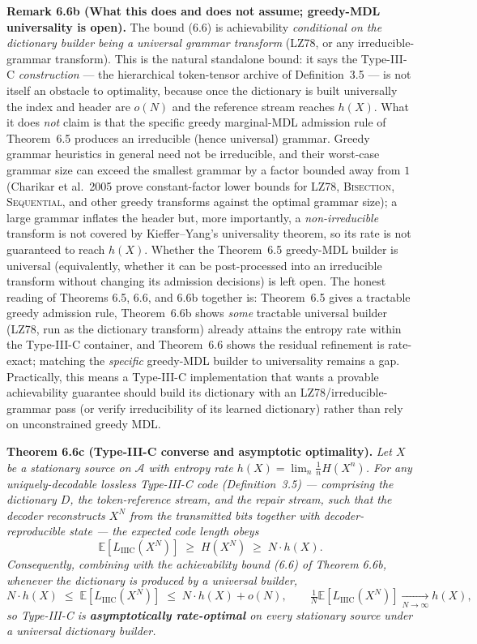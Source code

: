 \documentclass[
]{article}
\begin{document}
\textbf{Remark 6.6b (What this does and does not assume; greedy-MDL
universality is open).} The bound (6.6) is achievability
\emph{conditional on the dictionary builder being a universal grammar
transform} (LZ78, or any irreducible-grammar transform). This is the
natural standalone bound: it says the Type-III-C \emph{construction}
--- the hierarchical token-tensor archive of Definition~3.5 --- is not
itself an obstacle to optimality, because once the dictionary is built
universally the index and header are $o(N)$ and the reference stream
reaches $h(X)$. What it does \emph{not} claim is that the specific
greedy marginal-MDL admission rule of Theorem~6.5 produces an
irreducible (hence universal) grammar. Greedy grammar heuristics in
general need not be irreducible, and their worst-case grammar size can
exceed the smallest grammar by a factor bounded away from $1$ (Charikar
et al.\ 2005 prove constant-factor lower bounds for LZ78, \textsc{Bisection},
\textsc{Sequential}, and other greedy transforms against the optimal
grammar size); a large grammar inflates the header but, more
importantly, a \emph{non-irreducible} transform is not covered by
Kieffer--Yang's universality theorem, so its rate is not guaranteed to
reach $h(X)$. Whether the Theorem~6.5 greedy-MDL builder is universal
(equivalently, whether it can be post-processed into an irreducible
transform without changing its admission decisions) is left open. The
honest reading of Theorems 6.5, 6.6, and 6.6b together is: Theorem~6.5
gives a tractable greedy admission rule, Theorem~6.6b shows
\emph{some} tractable universal builder (LZ78, run as the dictionary
transform) already attains the entropy rate within the Type-III-C
container, and Theorem~6.6 shows the residual refinement is rate-exact;
matching the \emph{specific} greedy-MDL builder to universality remains
a gap. Practically, this means a Type-III-C implementation that wants a
provable achievability guarantee should build its dictionary with an
LZ78/irreducible-grammar pass (or verify irreducibility of its learned
dictionary) rather than rely on unconstrained greedy MDL.

\textbf{Theorem 6.6c (Type-III-C converse and asymptotic optimality).}
\emph{Let $X$ be a stationary source on $\mathcal{A}$ with entropy rate
$h(X) = \lim_{n} \tfrac{1}{n} H(X^n)$. For \emph{any} uniquely-decodable
lossless Type-III-C code (Definition~3.5) --- comprising the dictionary
$D$, the token-reference stream, and the repair stream, such that the
decoder reconstructs $X^N$ from the transmitted bits together with
decoder-reproducible state --- the expected code length obeys}
\[
\mathbb{E}\!\left[L_{\mathrm{IIIC}}(X^N)\right] \;\ge\; H(X^N) \;\ge\;
N\cdot h(X).
\tag{6.6c.1}
\]
\emph{Consequently, combining with the achievability bound (6.6) of
Theorem 6.6b, whenever the dictionary is produced by a universal
builder,}
\[
N\cdot h(X) \;\le\; \mathbb{E}\!\left[L_{\mathrm{IIIC}}(X^N)\right]
\;\le\; N\cdot h(X) + o(N),
\qquad
\tfrac{1}{N}\mathbb{E}\!\left[L_{\mathrm{IIIC}}(X^N)\right]
\xrightarrow[N\to\infty]{} h(X),
\]
\emph{so Type-III-C is \textbf{asymptotically rate-optimal} on every
stationary source under a universal dictionary builder.}
\end{document}
